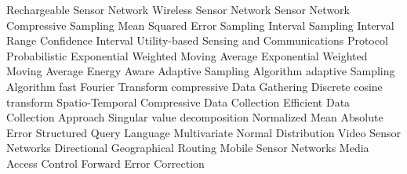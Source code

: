 \begin{acronym}[YTM]
   {Rechargeable Sensor Network}
   {Wireless Sensor Network}
    {Sensor Network}
    {Compressive Sampling}
   {Mean Squared Error}
    {Sampling Interval}
   {Sampling Interval Range}
    {Confidence Interval}
  {Utility-based Sensing and Communications Protocol}
 {Probabilistic Exponential Weighted Moving Average}
  {Exponential Weighted Moving Average}
  {Energy Aware Adaptive Sampling Algorithm}
   {adaptive Sampling Algorithm}
   {fast Fourier Transform}
   {compressive Data Gathering}
   {Discrete cosine transform}
 {Spatio-Temporal Compressive Data Collection}
  {Efficient Data Collection Approach}
   {Singular value decomposition}
  {Normalized Mean Absolute Error}
   {Structured Query Language}
   {Multivariate Normal Distribution}
   {Video Sensor Networks}
   {Directional Geographical Routing}
   {Mobile Sensor Networks}
   {Media Access Control}
   {Forward Error Correction}
\end{acronym}